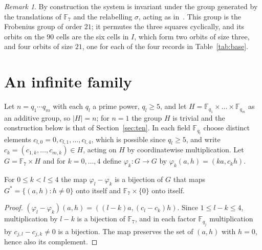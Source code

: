 \documentclass[11pt]{amsart}
\theoremstyle{definition}\newtheorem{definition}[theorem]{Definition}
\theoremstyle{remark}\newtheorem{remark}[theorem]{Remark}
\begin{document}
\begin{remark}\label{rem:aut}
By construction the system is invariant under the group generated by the translations of $\mathbb F_7$ and the
relabelling $\sigma$, acting as in~\cite[Lemma~2.19]{ABW}. This group is the Frobenius group of order $21$; it permutes
the three squares cyclically, and its orbits on the $90$ cells are the six cells in $I$, which form two orbits of size
three, and four orbits of size $21$, one for each of the four records in Table~\ref{tab:base}.
\end{remark}

\section{An infinite family}\label{sec:family}
Let $n=q_1\cdots q_m$ with each $q_l$ a prime power, $q_l\ge5$, and let $H=\mathbb F_{q_1}\times\dots\times\mathbb F_{q_m}$
as an additive group, so $|H|=n$; for $n=1$ the group $H$ is trivial and the construction below is that of
Section~\ref{sec:ten}. In each field $\mathbb F_{q_l}$ choose distinct elements $c_{l,0}=0,c_{l,1},\dots,c_{l,4}$, which
is possible since $q_l\ge5$, and write $c_k=(c_{1,k},\dots,c_{m,k})\in H$, acting on $H$ by coordinatewise
multiplication. Let $G=\mathbb F_7\times H$ and for $k=0,\dots,4$ define $\varphi_k\colon G\to G$ by
$\varphi_k(a,h)=(ka,c_kh)$.

\begin{lemma}\label{lem:lines}
For $0\le k<l\le4$ the map $\varphi_l-\varphi_k$ is a bijection of $G$ that maps $G^*=\{(a,h):h\ne0\}$ onto itself and
$\mathbb F_7\times\{0\}$ onto itself.
\end{lemma}

\begin{proof}
$(\varphi_l-\varphi_k)(a,h)=((l-k)a,(c_l-c_k)h)$. Since $1\le l-k\le4$, multiplication by $l-k$ is a bijection of
$\mathbb F_7$, and in each factor $\mathbb F_{q_j}$ multiplication by $c_{j,l}-c_{j,k}\ne0$ is a bijection. The map
preserves the set of $(a,h)$ with $h=0$, hence also its complement.
\end{proof}
\end{document}
